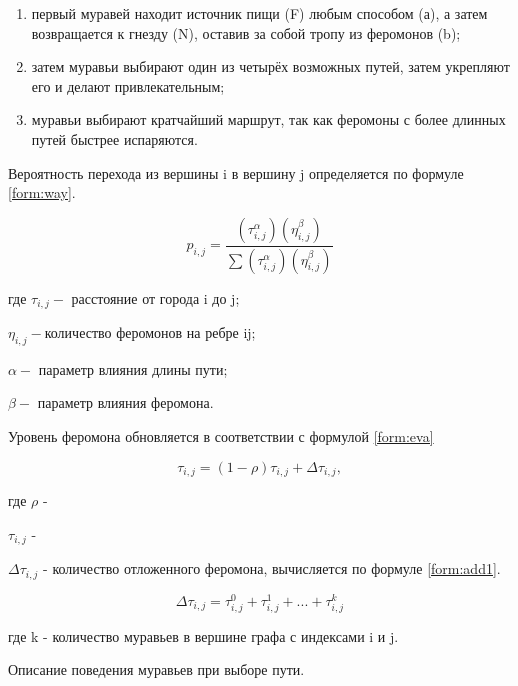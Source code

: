 \begin{enumerate}
	\item первый муравей находит источник пищи (F) любым способом (а), а затем возвращается к гнезду (N), оставив за собой тропу из феромонов (b);
	\item затем муравьи выбирают один из четырёх возможных путей, затем укрепляют его и делают привлекательным;
	\item муравьи выбирают кратчайший маршрут, так как феромоны с более длинных путей быстрее испаряются.
\end{enumerate}


Вероятность перехода из вершины i в вершину j определяется по формуле \ref{form:way}.

\begin{equation}\label{form:way}
	p_{i,j}={\frac {(\tau_{i,j}^{\alpha })(\eta_{i,j}^{\beta })}{\sum (\tau_{i,j}^{\alpha })(\eta_{i,j}^{\beta })}}
\end{equation}

где $ \tau_{i,j} - $ расстояние от города i до j;

$\eta_{i,j} - $количество феромонов на ребре ij;

$\alpha - $ параметр влияния длины пути;

$\beta - $ параметр влияния феромона.

Уровень феромона обновляется в соответствии с формулой \ref{form:eva}


\begin{equation}\label{form:eva}
	\tau_{i,j}=(1-\rho )\tau_{i,j}+\Delta \tau_{i,j},
\end{equation}

где $\rho$ - 

$\tau_{i,j}$ - 

$\Delta \tau_{i,j}$ - количество отложенного феромона, вычисляется по формуле \ref{form:add1}.

\begin{equation}\label{form:add1}
	\Delta \tau_{i,j}= \tau_{i,j}^0 + \tau_{i,j}^1 + ... + \tau_{i,j}^k
\end{equation}

где k - количество муравьев в вершине графа с индексами i и j.


Описание поведения муравьев при выборе пути.

